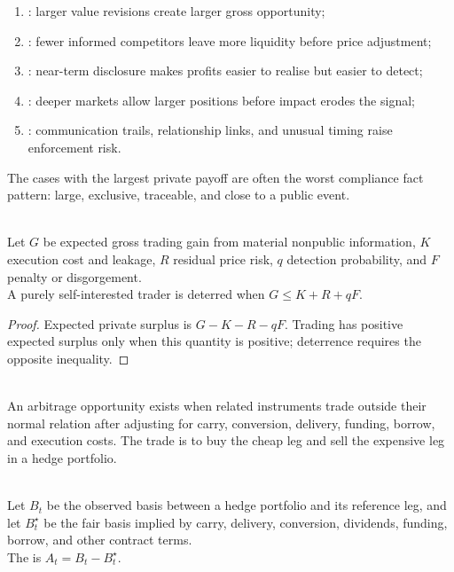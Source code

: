 \documentclass[a4paper,oneside,openany]{book}
\begin{document}
\begin{taxonomy} 
\begin{enumerate}[label=\roman*.]
\setlength{\itemsep}{0pt}
\item {}: larger value revisions create larger gross opportunity;
\item {}: fewer informed competitors leave more liquidity before price adjustment;
\item {}: near-term disclosure makes profits easier to realise but easier to detect;
\item {}: deeper markets allow larger positions before impact erodes the signal;
\item {}: communication trails, relationship links, and unusual timing raise enforcement risk.
\end{enumerate}
The cases with the largest private payoff are often the worst compliance fact pattern: large, exclusive, traceable, and close to a public event.
\end{taxonomy}

\begin{proposition} \\
Let $G$ be expected gross trading gain from material nonpublic information, $K$ execution cost and leakage, $R$ residual price risk, $q$ detection probability, and $F$ penalty or disgorgement.\\
A purely self-interested trader is deterred when $G\le K+R+qF$.
\begin{proof}
Expected private surplus is $G-K-R-qF$. Trading has positive expected surplus only when this quantity is positive; deterrence requires the opposite inequality.
\end{proof}
\end{proposition}

\begin{definition} \\
An arbitrage opportunity exists when related instruments trade outside their normal relation after adjusting for carry, conversion, delivery, funding, borrow, and execution costs. The trade is to buy the cheap leg and sell the expensive leg in a hedge portfolio.
\end{definition}

\begin{notation} \\
Let $B_t$ be the observed basis between a hedge portfolio and its reference leg, and let $B_t^\star$ be the fair basis implied by carry, delivery, conversion, dividends, funding, borrow, and other contract terms.\\
The  is $A_t=B_t-B_t^\star$.
\end{notation}
\end{document}
